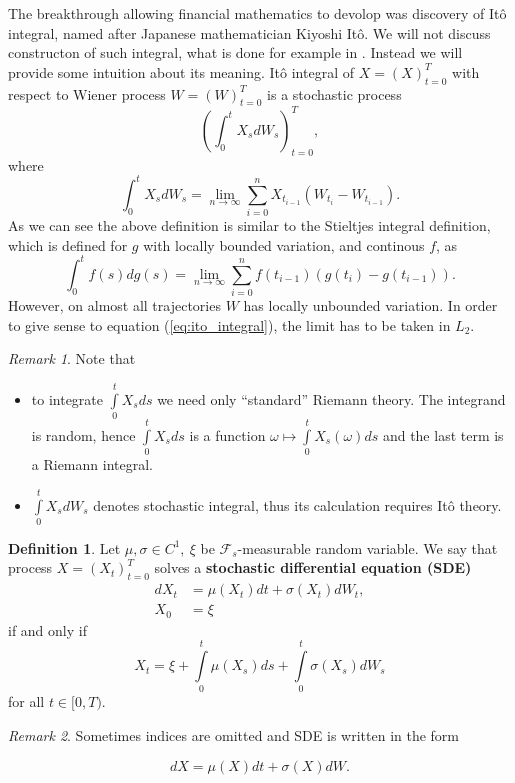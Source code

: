 \documentclass[a4paper,12pt, oneside]{book}
\theoremstyle{definition}
\newtheorem{mydef}{Definition}[chapter]
\theoremstyle{remark}
\newtheorem{remark}{Remark}[chapter]
\begin{document}
The breakthrough allowing financial mathematics to devolop was discovery of It\^{o} integral, named after Japanese mathematician Kiyoshi It\^{o}. We will not discuss constructon of such integral, what is done for example in \cite{latala}.
Instead we will provide some intuition about its meaning. It\^{o} integral of $X=(X)_{t=0}^T$ with respect to Wiener process $W=(W)_{t=0}^T$ is a stochastic process
\[ \left( \int_0^{t} X_s dW_s \right)_{t = 0}^T, \]
where
\begin{equation}
 \label{eq:ito_integral}
  \int_0^{t} X_s dW_s = \lim_{n \rightarrow \infty} \sum\limits_{i=0}^n X_{t_{i-1}} (W_{t_i} - W_{t_{i-1}}).
\end{equation}
As we can see the above definition is similar to the Stieltjes integral definition, which is defined for $g$ with locally bounded variation, and continous $f$, as
\[  \int_0^{t} f(s) dg(s) = \lim_{n \rightarrow \infty} \sum\limits_{i=0}^n f(t_{i-1}) (g(t_i) - g(t_{i-1})). \]
However, on almost all trajectories $W$ has locally unbounded variation. In order to give sense to equation (\ref{eq:ito_integral}), the limit has to be taken in $L_2$.

\begin{remark} Note that
\begin{itemize}
 \item to integrate $\int\limits_0^t X_s ds$ we need only ``standard'' Riemann theory. The integrand is random, hence $\int\limits_0^t X_s ds$ is a function $\omega \mapsto \int\limits_0^t X_s(\omega) ds$ and the last term is a Riemann integral.
 \item $\int\limits_0^t X_s dW_s$ denotes stochastic integral, thus its calculation requires It\^{o} theory.
\end{itemize}
\end{remark}


\begin{mydef}
\label{def:SDE}
 Let $\mu, \sigma \in C^1,\ \xi$ be $\mathcal{F}_s$-measurable random variable. We say that process $X=(X_t)_{t=0}^T$ solves a \textbf{stochastic differential equation (SDE)}
 \begin{equation*}
 \begin{split}
   dX_t &= \mu(X_t)dt + \sigma(X_t) dW_t,\\
   X_0 &= \xi  
 \end{split}  
 \end{equation*}
 if and only if
 \[X_t = \xi + \int\limits_0^t \mu(X_s)ds + \int\limits_0^t\sigma(X_s) dW_s\]
for all $t \in [0,T)$.
\end{mydef}
\begin{remark}
 Sometimes indices are omitted and SDE is written in the form
\end{remark}
\[ dX = \mu(X)dt + \sigma(X) dW. \]
\end{document}
